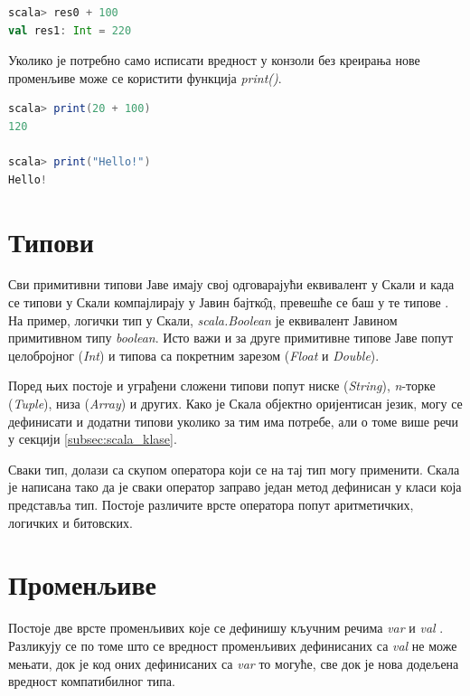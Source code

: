 \documentclass[12pt,oneside]{memoir}
\begin{document}
\begin{lstlisting}[language=Scala, caption={Коришћење резултатских променљивих}, label={lst:scala_res0_example}]
scala> res0 + 100
val res1: Int = 220
\end{lstlisting}

Уколико је потребно само исписати вредност у конзоли без креирања нове променљиве може се користити функција \textit{print()}.

\begin{lstlisting}[language=Scala, caption={Функција print}, label={lst:scala_interpret_print_func}]
scala> print(20 + 100)
120

scala> print("Hello!")
Hello!
\end{lstlisting}

\section{Типови}
\label{sec:scala_tip}

Сви примитивни типови Јаве имају свој одговарајући еквивалент у Скали и када се типови у Скали компајлирају у Јавин бајтк\^{о}д, превешће се баш у те типове \cite{scala_prog}. На пример, логички тип у Скали, \textit{scala.Boolean} је еквивалент Јавином примитивном типу \textit{boolean}. Исто важи и за друге примитивне типове Јаве попут целобројног (\textit{Int}) и типова са покретним зарезом (\textit{Float} и \textit{Double}).

Поред њих постоје и уграђени сложени типови попут ниске (\textit{String}), \textit{n}-торке (\textit{Tuple}), низа (\textit{Array}) и других. Како је Скала објектно оријентисан језик, могу се дефинисати и додатни типови уколико за тим има потребе, али о томе више речи у секцији \ref{subsec:scala_klase}.

Сваки тип, долази са скупом оператора који се на тај тип могу применити. Скала је написана тако да је сваки оператор заправо један метод дефинисан у класи која представља тип. Постоје различите врсте оператора попут аритметичких, логичких и битовских.

\section{Променљиве}
\label{sec:scala_prom}

Постоје две врсте променљивих које се дефинишу кључним речима \textit{var} и \textit{val} \cite{scala_prog}. Разликују се по томе што се вредност променљивих дефинисаних са \textit{val} не може мењати, док је код оних дефинисаних са \textit{var} то могуће, све док је нова додељена вредност компатибилног типа.
\end{document}
